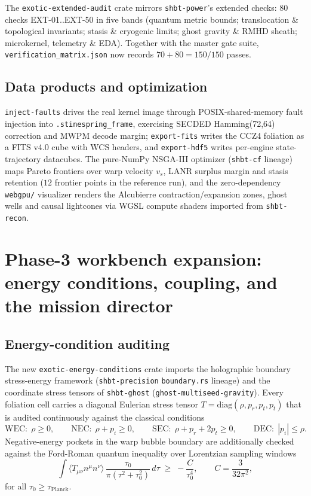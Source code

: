 \documentclass[aps,pra,10pt,onecolumn,superscriptaddress,nofootinbib,longbibliography,floatfix]{revtex4-2}
\newcommand{\ExoticGatePass}{70}%
\newcommand{\ExoticExtPass}{80}%
\newcommand{\ExoticExtTotal}{80}%
\newcommand{\ExoticNsgaFrontier}{12}%
\begin{document}
The \texttt{exotic-extended-audit} crate mirrors \texttt{shbt-power}'s extended
checks: $\ExoticExtTotal$ checks EXT-01..EXT-50 in five bands (quantum metric
bounds; translocation \& topological invariants; stasis \& cryogenic limits;
ghost gravity \& RMHD sheath; microkernel, telemetry \& EDA).  Together with the
master gate suite, \texttt{verification\_matrix.json} now records
$\ExoticGatePass+\ExoticExtPass = 150/150$ passes.

\subsection{Data products and optimization}

\texttt{inject-faults} drives the real kernel image through POSIX-shared-memory
fault injection into \texttt{.stinespring\_frame}, exercising SECDED
Hamming(72,64) correction and MWPM decode margin; \texttt{export-fits} writes the
CCZ4 foliation as a FITS v4.0 cube with WCS headers, and \texttt{export-hdf5}
writes per-engine state-trajectory datacubes.  The pure-NumPy NSGA-III optimizer
(\texttt{shbt-cf} lineage) maps Pareto frontiers over warp velocity $v_s$, LANR
surplus margin and stasis retention ($\ExoticNsgaFrontier$ frontier points in the
reference run), and the zero-dependency \texttt{webgpu/} visualizer renders the
Alcubierre contraction/expansion zones, ghost wells and causal lightcones via
WGSL compute shaders imported from \texttt{shbt-recon}.

\section{Phase-3 workbench expansion: energy conditions, coupling, and the mission director}\label{sec:phase3}

\subsection{Energy-condition auditing}

The new \texttt{exotic-energy-conditions} crate imports the holographic
boundary stress-energy framework (\texttt{shbt-precision} \texttt{boundary.rs}
lineage) and the coordinate stress tensors of \texttt{shbt-ghost}
(\texttt{ghost-multiseed-gravity}).  Every foliation cell carries a diagonal
Eulerian stress tensor $T=\mathrm{diag}(\rho,p_r,p_t,p_t)$ that is audited
continuously against the classical conditions
\begin{equation}
\mathrm{WEC}:\;\rho\ge0,\qquad
\mathrm{NEC}:\;\rho+p_i\ge0,\qquad
\mathrm{SEC}:\;\rho+p_r+2p_t\ge0,\qquad
\mathrm{DEC}:\;|p_i|\le\rho .
\end{equation}
Negative-energy pockets in the warp bubble boundary are additionally checked
against the Ford-Roman quantum inequality over Lorentzian sampling windows
\begin{equation}
\int \langle T_{\mu\nu} n^\mu n^\nu\rangle\,
\frac{\tau_0}{\pi(\tau^2+\tau_0^2)}\,d\tau
\;\ge\; -\frac{C}{\tau_0^{4}},\qquad C=\frac{3}{32\pi^2},
\end{equation}
for all $\tau_0 \ge \tau_{\mathrm{Planck}}$.
\end{document}
